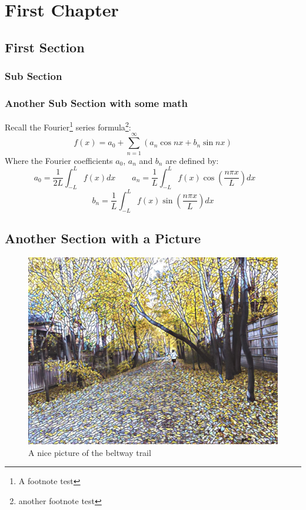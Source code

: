 \documentclass[10pt,letterpaper,twoside,final]{memoir}
\begin{document}
\setlength{\parskip}{1.1ex}
\tableofcontents
\setlength{\parskip}{2.5ex}

\chapter{First Chapter}

\lipsum[1-2]

\section{First Section}

\lipsum[3-5]

\subsection{Sub Section}

\lipsum[7-9]

\subsection{Another Sub Section with some math}

\lipsum[6-8]
Recall the Fourier\footnote{A footnote test} series formula\footnote{another footnote test \lipsum[1]}:
\[
f(x) = a_0 + \sum_{n = 1}^\infty \left( a_n \cos nx + b_n \sin nx \right)
\]
Where the Fourier coefficients $a_0$, $a_n$ and $b_n$ are defined by:
\[
a_0 = \frac{1}{2L} \int_{-L}^L f(x) dx  \qquad
a_n = \frac{1}{L}  \int_{-L}^L f(x) \cos \left( \frac{n\pi x}{L} \right) dx \qquad
\]
\[
b_n = \frac{1}{L}  \int_{-L}^L f(x) \sin \left( \frac{n\pi x}{L} \right) dx 
\]
\lipsum[33-34]

\section{Another Section with a Picture}

\lipsum[9]
\begin{figure}
\centering
\hspace{-2in}\includegraphics[width=7in]{TrailPic1}
\caption{\label{fig:path}A nice picture of the beltway trail}
\end{figure}
\end{document}
